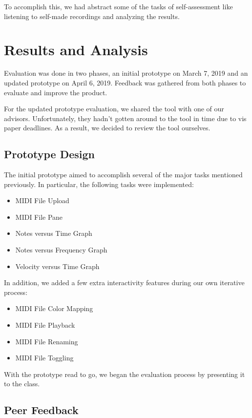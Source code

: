 \documentclass[journal]{vgtc}                %
\begin{document}
To accomplish this, we had abstract some of the tasks of self-assessment like
listening to self-made recordings and analyzing the results. 

\section{Results and Analysis}

Evaluation was done in two phases, an initial prototype on March 7, 2019 and an
updated prototype on April 6, 2019. Feedback was gathered from both phases to
evaluate and improve the product.

For the updated prototype evaluation, we shared the tool with one of our advisors.
Unfortunately, they hadn’t gotten around to the tool in time due to vis paper
deadlines. As a result, we decided to review the tool ourselves.

\subsection{Prototype Design}

The initial prototype aimed to accomplish several of the major tasks mentioned
previously. In particular, the following tasks were implemented:

\begin{itemize}
  \item MIDI File Upload
  \item MIDI File Pane
  \item Notes versus Time Graph
  \item Notes versus Frequency Graph
  \item Velocity versus Time Graph
\end{itemize}

In addition, we added a few extra interactivity features during our own
iterative process:

\begin{itemize}
  \item MIDI File Color Mapping
  \item MIDI File Playback
  \item MIDI File Renaming
  \item MIDI File Toggling
\end{itemize}

With the prototype read to go, we began the evaluation process by presenting
it to the class.

\subsection{Peer Feedback}
\end{document}
